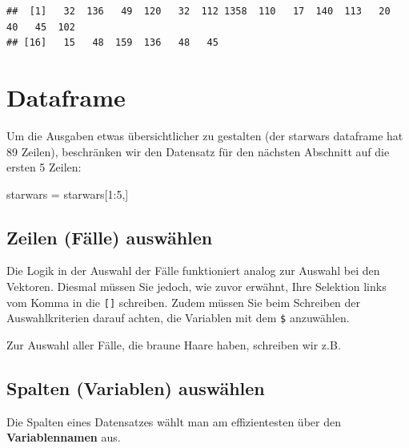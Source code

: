 \documentclass[
]{book}
\newenvironment{Shaded}{\begin{snugshade}}{\end{snugshade}}
\newcommand{\CommentTok}[1]{\textcolor[rgb]{0.56,0.35,0.01}{\textit{#1}}}
\newcommand{\DecValTok}[1]{\textcolor[rgb]{0.00,0.00,0.81}{#1}}
\newcommand{\NormalTok}[1]{#1}
\newcommand{\OtherTok}[1]{\textcolor[rgb]{0.56,0.35,0.01}{#1}}
\newcommand{\SpecialCharTok}[1]{\textcolor[rgb]{0.00,0.00,0.00}{#1}}
\begin{document}
\begin{verbatim}
##  [1]   32  136   49  120   32  112 1358  110   17  140  113   20   40   45  102
## [16]   15   48  159  136   48   45
\end{verbatim}

\hypertarget{dataframe}{%
\section{Dataframe}\label{dataframe}}

Um die Ausgaben etwas übersichtlicher zu gestalten (der starwars dataframe hat 89 Zeilen), beschränken wir den Datensatz für den nächsten Abschnitt auf die ersten 5 Zeilen:

\begin{Shaded}
\begin{Highlighting}[]
\NormalTok{starwars }\OtherTok{=}\NormalTok{ starwars[}\DecValTok{1}\SpecialCharTok{:}\DecValTok{5}\NormalTok{,]}
\end{Highlighting}
\end{Shaded}

\hypertarget{zeilen-fuxe4lle-auswuxe4hlen}{%
\subsection{Zeilen (Fälle) auswählen}\label{zeilen-fuxe4lle-auswuxe4hlen}}

Die Logik in der Auswahl der Fälle funktioniert analog zur Auswahl bei den Vektoren. Diesmal müssen Sie jedoch, wie zuvor erwähnt, Ihre Selektion links vom Komma in die \texttt{{[}{]}} schreiben. Zudem müssen Sie beim Schreiben der Auswahlkriterien darauf achten, die Variablen mit dem \texttt{\$} anzuwählen.

Zur Auswahl aller Fälle, die braune Haare haben, schreiben wir z.B.

\begin{Shaded}
\end{Shaded}

\hypertarget{spalten-variablen-auswuxe4hlen}{%
\subsection{Spalten (Variablen) auswählen}\label{spalten-variablen-auswuxe4hlen}}

Die Spalten eines Datensatzes wählt man am effizientesten über den \textbf{Variablennamen} aus.
\end{document}
